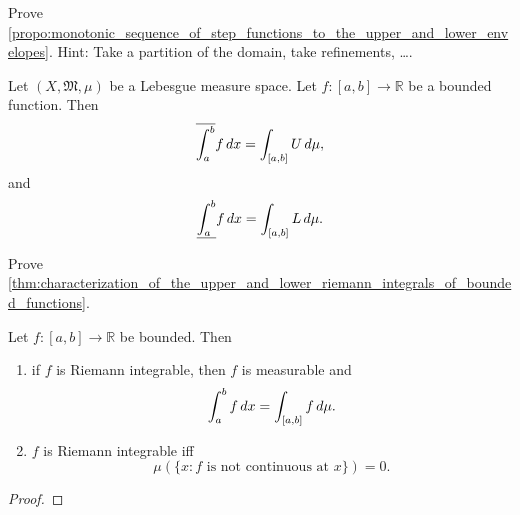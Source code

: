 \documentclass[notoc,notitlepage]{tufte-book}
\begin{document}
\begin{ex}
  Prove
  \cref{propo:monotonic_sequence_of_step_functions_to_the_upper_and_lower_envelopes}.
  Hint: Take a partition of the domain, take refinements, \ldots.
\end{ex}

\begin{thm}\label{thm:characterization_of_the_upper_and_lower_riemann_integrals_of_bounded_functions}
  Let $(X, \mathfrak{M}, \mu)$ be a Lebesgue measure space.
  Let $f : [a, b] \to \mathbb{R}$ be a bounded function.
  Then
  \begin{equation*}
    \overline{\int_{a}^{b}} f \mathop{}\!d{x} = \int_{[a, b]} U \mathop{}\!d{\mu},
  \end{equation*}
  and
  \begin{equation*}
    \underline{\int_{a}^{b}} f \mathop{}\!d{x} = \int_{[a, b]} L \mathop{}\!d{\mu}.
  \end{equation*}
\end{thm}

\begin{ex}
  Prove
  \cref{thm:characterization_of_the_upper_and_lower_riemann_integrals_of_bounded_functions}.
\end{ex}

\begin{thm}\label{thm:agreement_of_riemann_integration_and_lebesgue_integration_for_bounded_functions}
  Let $f : [a, b] \to \mathbb{R}$ be bounded. Then
  \begin{enumerate}
    \item if $f$ is Riemann integrable, then $f$ is measurable and
      \begin{equation*}
        \int_{a}^{b} f \mathop{}\!d{x} = \int_{[a, b]} f \mathop{}\!d{\mu}.
      \end{equation*}
    \item $f$ is Riemann integrable iff
      \begin{equation*}
        \mu(\{x : f \text{ is not continuous at } x\}) = 0.
      \end{equation*}
  \end{enumerate}
\end{thm}

\begin{proof}
\end{proof}

\end{document}
